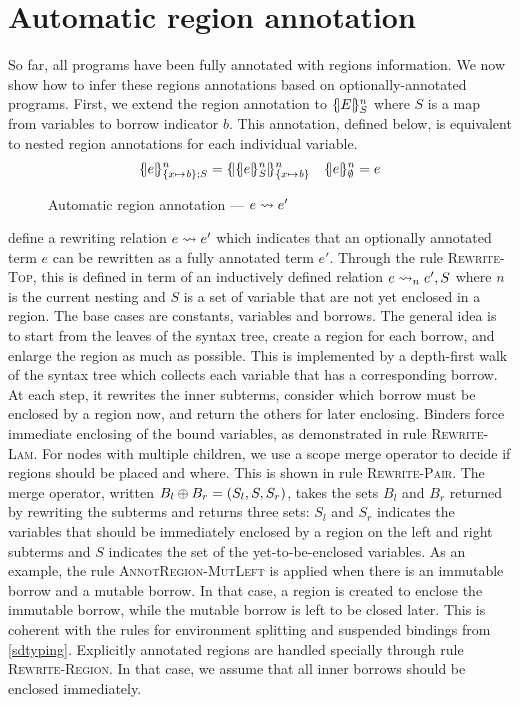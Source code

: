 \section{Automatic region annotation}
\label{regionannot}


So far, all \lang programs have been fully annotated with regions information.
We now show how to infer these regions annotations based on
optionally-annotated programs.
First, we extend the region annotation to $\region{S}{E}$ where $S$ is
a map from variables to borrow indicator $b$. This annotation, defined below, is equivalent to nested
region annotations for each individual variable.
%
\begin{align*}
  \region{\Sone x\BORROW;S}{e} &= \region{\Sone x\BORROW}{\region{S}{e}}& \region{\emptyset}{e} &= e\\
\end{align*}
%
\begin{figure*}[!tb]
  \centering
  
  \caption{Automatic region annotation --- $\RannotT{e}{e'}$}
  \label{fig:region-annotation}
\end{figure*}
%
 define a rewriting relation $\RannotT{e}{e'}$
which indicates that an optionally annotated term $e$ can be rewritten
as a fully annotated term $e'$.
Through the rule \textsc{Rewrite-Top}, this is defined
in term of an inductively defined relation
$\Rannot{e}{e'}{S}$ where $n$ is the current nesting and $S$ is a set of
variable that are not yet enclosed in a region.
The base cases are constants, variables and borrows.
The general idea is to start from the leaves of the syntax tree, create a
region for each borrow, and enlarge the region as much as possible.
This is implemented by a depth-first walk of the syntax
tree which collects each variable that has a corresponding borrow.
At each step, it rewrites the inner subterms,
consider which borrow must be enclosed by a region now, and
return the others for later enclosing. Binders force immediate
enclosing of the bound variables, as demonstrated in rule \textsc{Rewrite-Lam}.
For nodes with multiple children, we
use a scope merge operator to decide if regions should be placed and where.
This is shown in rule \textsc{Rewrite-Pair}.
The merge operator, written $\getBorrows{B_l}{B_r}{(S_l,S,S_r)}$, takes
the sets $B_l$ and $B_r$ returned by rewriting the subterms
and returns three sets: $S_l$ and $S_r$ indicates the variables
that should be immediately enclosed by a region on the left and right
subterms and $S$ indicates the set of the yet-to-be-enclosed variables.
As an example, the rule \textsc{AnnotRegion-MutLeft} is applied
when there is an immutable borrow and a mutable borrow. In that case, a
region is created to enclose the immutable borrow, while the mutable
borrow is left to be closed later. This is coherent with the rules
for environment splitting and suspended bindings from \cref{sdtyping}.
%
Explicitly annotated regions are handled specially through
rule \textsc{Rewrite-Region}. In that case, we assume that all inner
borrows should be enclosed immediately.



